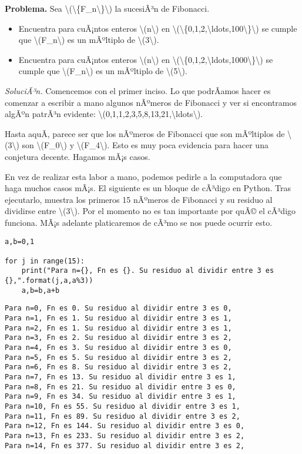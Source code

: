\documentclass[
]{article}
\begin{document}
\textbf{Problema.} Sea
{\textbackslash(\textbackslash\{F\_n\textbackslash\}\textbackslash)} la
sucesiÃ³n de Fibonacci.

\begin{itemize}
\item
  Encuentra para cuÃ¡ntos enteros {\textbackslash(n\textbackslash)} en
  {\textbackslash(\textbackslash\{0,1,2,\textbackslash ldots,100\textbackslash\}\textbackslash)}
  se cumple que {\textbackslash(F\_n\textbackslash)} es un mÃºltiplo de
  {\textbackslash(3\textbackslash)}.
\item
  Encuentra para cuÃ¡ntos enteros {\textbackslash(n\textbackslash)} en
  {\textbackslash(\textbackslash\{0,1,2,\textbackslash ldots,1000\textbackslash\}\textbackslash)}
  se cumple que {\textbackslash(F\_n\textbackslash)} es un mÃºltiplo de
  {\textbackslash(5\textbackslash)}.
\end{itemize}

\emph{SoluciÃ³n.} Comencemos con el primer inciso. Lo que podrÃ­amos
hacer es comenzar a escribir a mano algunos nÃºmeros de Fibonacci y ver
si encontramos algÃºn patrÃ³n evidente:
{\textbackslash(0,1,1,2,3,5,8,13,21,\textbackslash ldots\textbackslash)}.

Hasta aquÃ­, parece ser que los nÃºmeros de Fibonacci que son mÃºltiplos
de {\textbackslash(3\textbackslash)} son
{\textbackslash(F\_0\textbackslash)} y
{\textbackslash(F\_4\textbackslash)}. Esto es muy poca evidencia para
hacer una conjetura decente. Hagamos mÃ¡s casos.

En vez de realizar esta labor a mano, podemos pedirle a la computadora
que haga muchos casos mÃ¡s. El siguiente es un bloque de cÃ³digo en
Python. Tras ejecutarlo, muestra los primeros 15 nÃºmeros de Fibonacci y
su residuo al dividirse entre {\textbackslash(3\textbackslash)}. Por el
momento no es tan importante por quÃ© el cÃ³digo funciona. MÃ¡s adelante
platicaremos de cÃ³mo se nos puede ocurrir esto.

\begin{verbatim}
a,b=0,1

for j in range(15):
    print("Para n={}, Fn es {}. Su residuo al dividir entre 3 es {},".format(j,a,a%3))
    a,b=b,a+b
\end{verbatim}

\begin{verbatim}
Para n=0, Fn es 0. Su residuo al dividir entre 3 es 0,
Para n=1, Fn es 1. Su residuo al dividir entre 3 es 1,
Para n=2, Fn es 1. Su residuo al dividir entre 3 es 1,
Para n=3, Fn es 2. Su residuo al dividir entre 3 es 2,
Para n=4, Fn es 3. Su residuo al dividir entre 3 es 0,
Para n=5, Fn es 5. Su residuo al dividir entre 3 es 2,
Para n=6, Fn es 8. Su residuo al dividir entre 3 es 2,
Para n=7, Fn es 13. Su residuo al dividir entre 3 es 1,
Para n=8, Fn es 21. Su residuo al dividir entre 3 es 0,
Para n=9, Fn es 34. Su residuo al dividir entre 3 es 1,
Para n=10, Fn es 55. Su residuo al dividir entre 3 es 1,
Para n=11, Fn es 89. Su residuo al dividir entre 3 es 2,
Para n=12, Fn es 144. Su residuo al dividir entre 3 es 0,
Para n=13, Fn es 233. Su residuo al dividir entre 3 es 2,
Para n=14, Fn es 377. Su residuo al dividir entre 3 es 2,
\end{verbatim}
\end{document}
